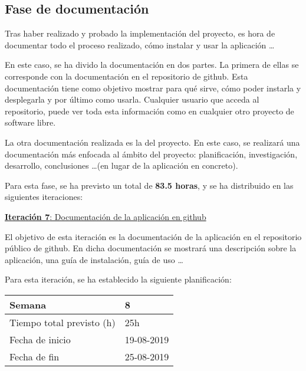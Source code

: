 \newpage

\subsection{Fase de documentación}

Tras haber realizado y probado la implementación del proyecto, es hora de documentar todo el proceso realizado, cómo instalar y usar la aplicación \ldots

En este caso, se ha divido la documentación en dos partes. La primera de ellas se corresponde con la documentación en el repositorio de github. Esta documentación tiene como objetivo mostrar para qué sirve, cómo poder instarla y desplegarla y por último como usarla. Cualquier usuario que acceda al repositorio, puede ver toda esta información como en cualquier otro proyecto de software libre.

La otra documentación realizada es la del proyecto. En este caso, se realizará una documentación más enfocada al ámbito del proyecto: planificación, investigación, desarrollo, conclusiones \ldots (en lugar de la aplicación en concreto). 

Para esta fase, se ha previsto un total de \textbf{83.5 horas}, y se ha distribuido en las siguientes iteraciones:

\newpage


\large{\underline{\textbf{Iteración 7}: Documentación de la aplicación en github}}
\vspace{0.3cm}

\normalsize

El objetivo de esta iteración es la documentación de la aplicación en el repositorio público de github. En dicha documentación se mostrará una descripción sobre la aplicación, una guía de instalación, guía de uso \ldots

Para esta iteración, se ha establecido la siguiente planificación:

\begin{table}[h!]
\centering
\begin{tabular}{|p{5cm}|p{4cm}|}
 \hline
	\cellcolor[gray]{0.9} Semana  & 8\\ \hline
	\cellcolor[gray]{0.9} Tiempo total previsto (h)  & 25h \\ \hline
	\cellcolor[gray]{0.9} Fecha de inicio  & 19-08-2019 \\ \hline
	\cellcolor[gray]{0.9} Fecha de fin  & 25-08-2019 \\ \hline
		
\end{tabular}
\end{table}

